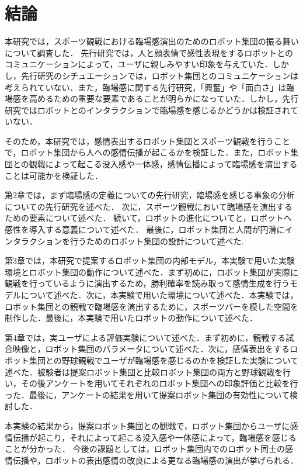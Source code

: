 \chapter{結論}
\thispagestyle{fancy}
\lhead{}
\chead{}
\rhead{}
\lfoot{} 
\cfoot{\thepage}
\rfoot{}

本研究では，スポーツ観戦における臨場感演出のためのロボット集団の振る舞いについて調査した．
先行研究では，人と顔表情で感性表現をするロボットとのコミュニケーションによって，ユーザに親しみやすい印象を与えていた．しかし，先行研究のシチュエーションでは，ロボット集団とのコミュニケーションは考えられていない．また，臨場感に関する先行研究，「興奮」や「面白さ」は臨場感を高めるための重要な要素であることが明らかになっていた．しかし，先行研究ではロボットとのインタラクションで臨場感を感じるかどうかは検証されていない．

そのため，本研究では，感情表出するロボット集団とスポーツ観戦を行うことで，ロボット集団から人への感情伝播が起こるかを検証した．また，ロボット集団との観戦によって起こる没入感や一体感，感情伝播によって臨場感を演出することは可能かを検証した．

第2章では，まず臨場感の定義についての先行研究，臨場感を感じる事象の分析についての先行研究を述べた．
次に，スポーツ観戦において臨場感を演出するための要素について述べた．
続いて，ロボットの進化についてと，ロボットへ感性を導入する意義について述べた．
最後に，ロボット集団と人間が円滑にインタラクションを行うためのロボット集団の設計について述べた.

第3章では，本研究で提案するロボット集団の内部モデル，本実験で用いた実験環境とロボット集団の動作について述べた．まず初めに，ロボット集団が実際に観戦を行っているように演出するため，勝利確率を読み取って感情生成を行うモデルについて述べた．次に，本実験で用いた環境について述べた．本実験では，ロボット集団との観戦で臨場感を演出するために，スポーツバーを模した空間を制作した．最後に，本実験で用いたロボットの動作について述べた．

第4章では，実ユーザによる評価実験について述べた．まず初めに，観戦する試合映像と，ロボット集団のパラメータについて述べた．次に，感情表出をするロボット集団との野球観戦でユーザが臨場感を感じるのかを検証した実験について述べた．被験者は提案ロボット集団と比較ロボット集団の両方と野球観戦を行い，その後アンケートを用いてそれぞれのロボット集団への印象評価と比較を行った．最後に，アンケートの結果を用いて提案ロボット集団の有効性について検討した．

本実験の結果から，提案ロボット集団との観戦で，ロボット集団からユーザに感情伝播が起こり，それによって起こる没入感や一体感によって，臨場感を感じることが分かった．
今後の課題としては，ロボット集団内でのロボット同士の感情伝播や，ロボットの表出感情の改良による更なる臨場感の演出が挙げられる．
